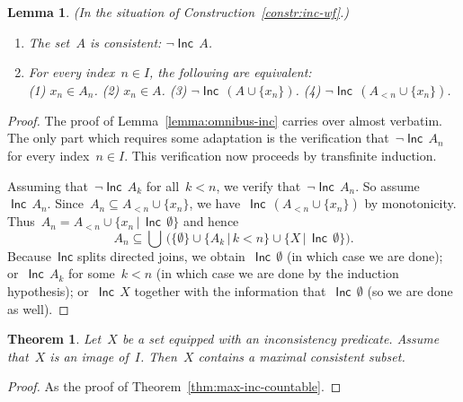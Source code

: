 \documentclass[com,11pt,crcready]{iosart2x}
\theoremstyle{definition}
\theoremstyle{plain}
\newtheorem{lemma}[definition]{Lemma}
\newtheorem{theorem}[definition]{Theorem}
\theoremstyle{remark}
\newcommand{\Incbare}{\mathsf{Inc}}
\newcommand{\Inc}[1]{\operatorname{\Incbare}\,#1}
\newcommand{\?}{\,{:}\,}
\renewcommand{\_}{\mathpunct{.}\,}
\begin{document}
\begin{lemma}\label{lemma:omnibus-inc-wf}(In the situation of
Construction~\ref{constr:inc-wf}.)
\begin{enumerate}
\item[(a)] The set~$A$ is consistent: $\neg \Inc{A}$.
\item[(b)] For every index~$n \in I$, the following are equivalent: \\
(1) $x_n \in A_n$. \quad
(2) $x_n \in A$. \quad
(3) $\neg \Inc{(A\cup\{x_n\})}$. \quad
(4) $\neg \Inc{(A_{<n} \cup \{x_n\})}$.
\end{enumerate}\end{lemma}

\begin{proof}The proof of Lemma~\ref{lemma:omnibus-inc} carries over almost
verbatim. The only part which requires some adaptation is the verification
that~$\neg \Inc{A_n}$ for every index~$n \in I$. This verification now proceeds by
transfinite induction.

Assuming that~$\neg \Inc{A_k}$ for all~$k < n$, we verify that~$\neg \Inc{A_n}$. So
assume~$\Inc{A_n}$. Since~$A_n \subseteq A_{<n} \cup \{x_n\}$, we have~$\Inc{(A_{<n}
\cup \{x_n\})}$ by monotonicity. Thus~$A_n = A_{<n} \cup
\{x_n\,|\,\Inc{\emptyset}\}$ and hence
\[ A_n \subseteq \bigcup\,\bigl(\{ \emptyset \} \cup \{ A_k \,|\, k < n \} \cup
\{ X \,|\, \Inc{\emptyset} \}\bigr). \]
Because~$\Incbare$ splits directed joins, we obtain~$\Inc{\emptyset}$ (in which case we
are done); or~$\Inc{A_k}$ for some~$k < n$ (in which case we are done by the
induction hypothesis); or~$\Inc{X}$ together with the information
that~$\Inc{\emptyset}$ (so we are done as well).
\end{proof}

\begin{theorem}\label{thm:max-inc-wf}Let~$X$ be a set equipped
with an inconsistency predicate. Assume that~$X$ is an image of~$I$.
Then~$X$ contains a maximal consistent subset.\end{theorem}

\begin{proof}As the proof of Theorem~\ref{thm:max-inc-countable}.\end{proof}


\nocite{label}

\end{document}

